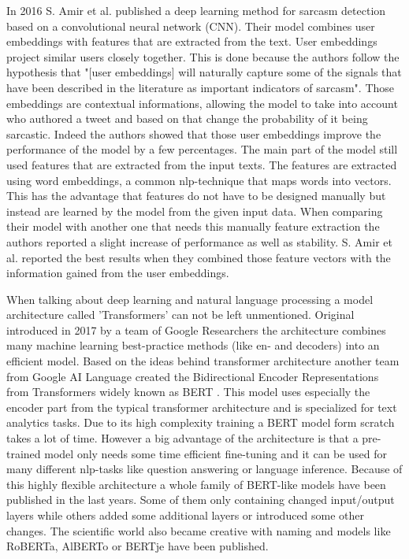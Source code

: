 \documentclass[sigconf,  review=false, nonacm=true]{acmart}
\begin{document}
In 2016 S. Amir et al. \cite{Modelling-Context-with-User-Embeddings-for-Sarcasm-Detection-in-Social-Media} published a deep learning method for sarcasm detection based on a convolutional neural network (CNN). Their model combines user embeddings with features that are extracted from the text. User embeddings project similar users closely together. This is done because the authors follow the hypothesis that "[user embeddings] will naturally capture some of the signals that have been described in the literature as important indicators of sarcasm". Those embeddings are contextual informations, allowing the model to take into account who authored a tweet and based on that change the probability of it being sarcastic. Indeed the authors showed that those user embeddings improve the performance of the model by a few percentages. 
The main part of the model still used features that are extracted from the input texts. The features are extracted using word embeddings, a common nlp-technique that maps words into vectors. This has the advantage that features do not have to be designed manually but instead are learned by the model from the given input data. When comparing their model with another one that needs this manually feature extraction the authors reported a slight increase of performance as well as stability. S. Amir et al. reported the best results when they combined those feature vectors with the information gained from the user embeddings.

When talking about deep learning and natural language processing a model architecture called 'Transformers' can not be left unmentioned. Original introduced in 2017 by a team of Google Researchers \cite{transformers} the architecture combines many machine learning best-practice methods (like en- and decoders) into an efficient model. Based on the ideas behind transformer architecture another team from Google AI Language created the Bidirectional Encoder Representations from Transformers widely known as BERT \cite{BERT}. This model uses especially the encoder part from the typical transformer architecture and is specialized for text analytics tasks. Due to its high complexity training a BERT model form scratch takes a lot of time. However a big advantage of the architecture is that a pre-trained model only needs some time efficient fine-tuning and it can be used for many different nlp-tasks like question answering or language inference. Because of this highly flexible architecture a whole family of BERT-like models have been published in the last years. Some of them only containing changed input/output layers while others added some additional layers or introduced some other changes. The scientific world also became creative with naming and models like RoBERTa, AlBERTo or BERTje have been published.
\end{document}
